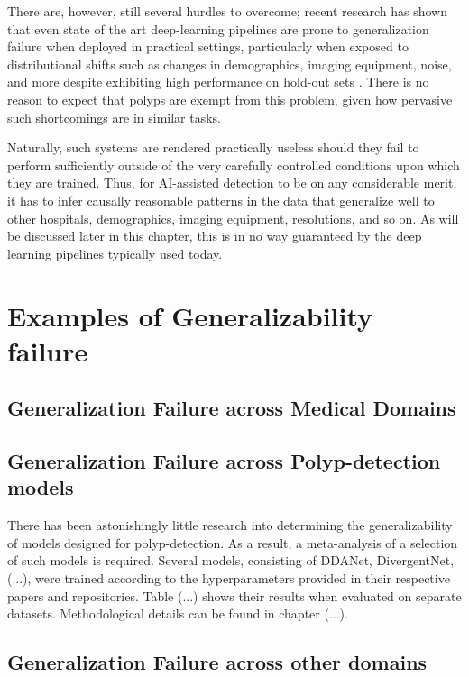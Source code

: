 
There are, however, still several hurdles to overcome; recent research has shown that even state of the art deep-learning pipelines are prone to generalization failure when deployed in practical settings, particularly when exposed to distributional shifts such as changes in demographics, imaging equipment, noise, and more despite exhibiting high performance on hold-out sets \cite{retinopathy, damour2020underspecification}. There is no reason to expect that polyps are exempt from this problem, given how pervasive such shortcomings are in similar tasks.

Naturally, such systems are rendered practically useless should they fail to perform sufficiently outside of the very carefully controlled conditions upon which they are trained. Thus, for AI-assisted detection to be on any considerable merit, it has to infer causally reasonable patterns in the data that generalize well to other hospitals, demographics, imaging equipment, resolutions, and so on. As will be discussed later in this chapter, this is in no way guaranteed by the deep learning pipelines typically used today.


\section{Examples of Generalizability failure}


\subsection{Generalization Failure across Medical Domains}

\subsection{Generalization Failure across Polyp-detection models}
There has been astonishingly little research into determining the generalizability of models designed for polyp-detection. As a result, a meta-analysis of a selection of such models is required. Several models, consisting of DDANet, DivergentNet, (...), were trained according to the hyperparameters provided in their respective papers and repositories. Table (...) shows their results when evaluated on separate datasets. Methodological details can be found in chapter (...).

\subsection{Generalization Failure across other domains}


